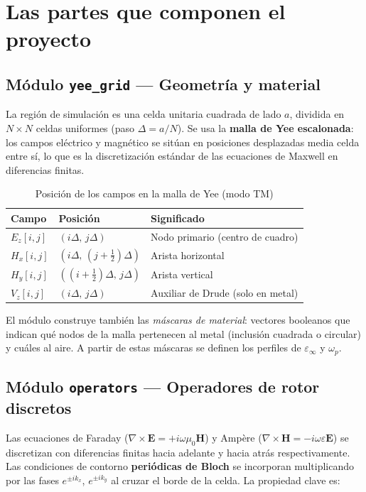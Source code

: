 \documentclass[12pt,a4paper]{article}
\begin{document}
\section{Las partes que componen el proyecto}

\subsection{Módulo \texttt{yee\_grid} — Geometría y material}

La región de simulación es una celda unitaria cuadrada de lado $a$, dividida en $N\times N$ celdas uniformes (paso $\Delta = a/N$). Se usa la \textbf{malla de Yee escalonada}: los campos eléctrico y magnético se sitúan en posiciones desplazadas media celda entre sí, lo que es la discretización estándar de las ecuaciones de Maxwell en diferencias finitas.

\begin{table}[h]
    \centering
    \caption{Posición de los campos en la malla de Yee (modo TM)}
    \begin{tabular}{@{}lll@{}}
        \toprule
        Campo & Posición & Significado \\
        \midrule
        $E_z[i,j]$ & $(i\Delta,\,j\Delta)$ & Nodo primario (centro de cuadro) \\
        $H_x[i,j]$ & $(i\Delta,\,(j+\tfrac{1}{2})\Delta)$ & Arista horizontal \\
        $H_y[i,j]$ & $((i+\tfrac{1}{2})\Delta,\,j\Delta)$ & Arista vertical \\
        $V_z[i,j]$ & $(i\Delta,\,j\Delta)$ & Auxiliar de Drude (solo en metal) \\
        \bottomrule
    \end{tabular}
\end{table}

El módulo construye también las \textit{máscaras de material}: vectores booleanos que indican qué nodos de la malla pertenecen al metal (inclusión cuadrada o circular) y cuáles al aire. A partir de estas máscaras se definen los perfiles de $\varepsilon_\infty$ y $\omega_p$.

\subsection{Módulo \texttt{operators} — Operadores de rotor discretos}

Las ecuaciones de Faraday ($\nabla\times\mathbf{E} = +i\omega\mu_0\mathbf{H}$) y Ampère ($\nabla\times\mathbf{H} = -i\omega\varepsilon\mathbf{E}$) se discretizan con diferencias finitas hacia adelante y hacia atrás respectivamente. Las condiciones de contorno \textbf{periódicas de Bloch} se incorporan multiplicando por las fases $e^{\pm ik_x}$, $e^{\pm ik_y}$ al cruzar el borde de la celda. La propiedad clave es:
\end{document}
